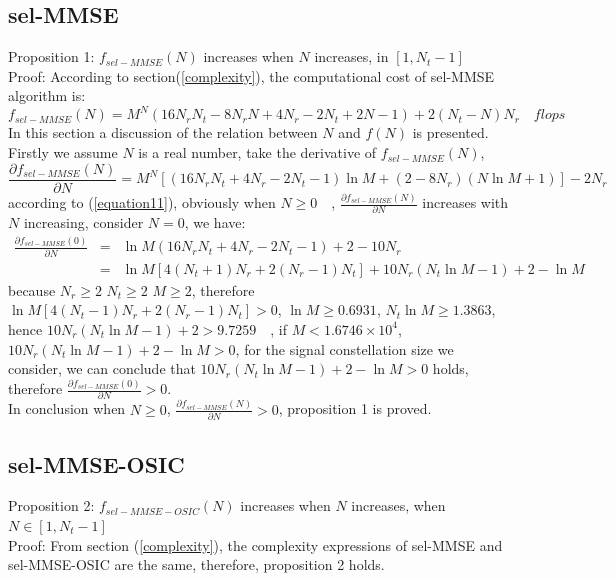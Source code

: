 \documentclass[12pt,a4paper,final]{article}
\begin{document}
\begin{spacing}{2.5}
\subsection{sel-MMSE}
Proposition 1: $f_{sel-MMSE}(N)$ increases when $N$ increases, in $[1,N_{t}-1]$\\
Proof: According to section(\ref{complexity}), the computational cost of sel-MMSE algorithm is:
\begin{equation}
f_{sel-MMSE}(N)=M^{N}(16N_{r}N_{t}-8N_{r}N+4N_{r}-2N_{t}+2N-1)+2(N_{t}-N)N_{r}\quad flops
\end{equation}
In this section a discussion of the relation between $N$ and $f(N)$ is presented. Firstly we assume $N$ is a real number, take the derivative of $f_{sel-MMSE}(N)$,
\begin{equation}
\frac{\partial f_{sel-MMSE}(N)}{\partial N}=M^{N}[(16N_{r}N_{t}+4N_{r}-2N_{t}-1)\ln{M}+(2-8N_{r})(N\ln{M}+1)]-2N_{r}\label{equation11}
\end{equation}
according to (\ref{equation11}), obviously when $N\geq 0\quad$, $\frac{\partial f_{sel-MMSE}(N)}{\partial N}$ increases with $N$ increasing, consider $N=0$, we have:
\begin{eqnarray}
\nonumber
\frac{\partial f_{sel-MMSE}(0)}{\partial N}&=&\ln{M}(16N_{r}N_{t}+4N_{r}-2N_{t}-1)+2-10N_{r}\\
\nonumber
&=&\ln{M}[4(N_{t}+1)N_{r}+2(N_{r}-1)N_{t}]+10N_{r}(N_{t}\ln{M}-1)+2-\ln{M}  \label{equation51}
\end{eqnarray}
because $N_{r}\geq 2$ $N_{t}\geq 2$ $M\geq 2$, therefore $\ln{M}[4(N_{t}-1)N_{r}+2(N_{r}-1)N_{t}]>0$, $\ln{M}\geq 0.6931$, $N_{t}\ln{M}\geq 1.3863$, hence $10N_{r}(N_{t}\ln{M}-1)+2>9.7259\quad$, if $M<1.6746\times 10^{4}$, $10N_{r}(N_{t}\ln{M}-1)+2-\ln{M}>0$, for the signal constellation size we consider, we can conclude that $10N_{r}(N_{t}\ln{M}-1)+2-\ln{M}>0$ holds, therefore $\frac{\partial f_{sel-MMSE}(0)}{\partial N}>0$.\\
In conclusion when $N\geq 0$, $\frac{\partial f_{sel-MMSE}(N)}{\partial N}>0$, proposition 1 is proved.
\subsection{sel-MMSE-OSIC}
Proposition 2: $f_{sel-MMSE-OSIC}(N)$ increases when $N$ increases, when $N\in [1, N_{t}-1]$\\
Proof: From section (\ref{complexity}), the complexity expressions of sel-MMSE and sel-MMSE-OSIC are the same, therefore, proposition 2 holds.


\end{spacing}
\end{document}

